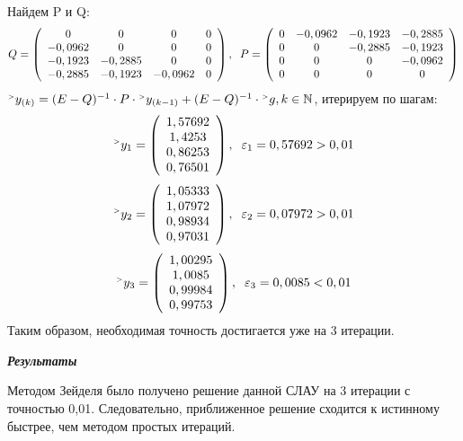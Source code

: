 \documentclass[12pt]{article}
\begin{document}
Найдем P и Q:
\begin{equation*}
	Q = \left(
	\begin{array}{cccc}
		0 & 0 & 0 & 0 \\
		-0,0962 & 0 & 0 & 0 \\
		-0,1923 & -0,2885 & 0 & 0 \\
		-0,2885 & -0,1923 & -0,0962 & 0 \\
	\end{array}
	\right), \hspace{0.2cm}
	P = \left(
	\begin{array}{cccc}
		0 & -0,0962 & -0,1923 & -0,2885 \\
		0 & 0 & -0,2885 & -0,1923 \\
		0 & 0 & 0 & -0,0962 \\
		0 & 0 & 0 & 0 \\
	\end{array}
	\right)
\end{equation*}
$ {}^{\mathsmaller{>}} y_{(k)} = (E-Q)^{-1} \cdot P\cdot 
{}^{\mathsmaller{>}} y_{(k-1)} + (E-Q)^{-1} \cdot
{}^{\mathsmaller{>}} g, k \in \mathbb{N} $, 
итерируем по шагам:
\begin{equation*}
	{}^{\mathsmaller{>}} y_{1}= 
	\left(
	\begin{array}{c}
		1,57692 \\ 1,4253 \\ 0,86253 \\ 0,76501 \\ 
	\end{array}
	\right), \hspace{0.2cm}
	\varepsilon_1 = 0,57692 > 0,01
\end{equation*}
\begin{equation*}
	{}^{\mathsmaller{>}} y_{2}= 
	\left(
	\begin{array}{c}
		1,05333 \\ 1,07972 \\ 0,98934 \\ 0,97031 \\ 
	\end{array}
	\right), \hspace{0.2cm}
	\varepsilon_2 = 0,07972 > 0,01
\end{equation*}
\begin{equation*}
	{}^{\mathsmaller{>}} y_{3}= 
	\left(
	\begin{array}{c}
		1,00295 \\ 1,0085 \\ 0,99984 \\ 0,99753 \\ 
	\end{array}
	\right), \hspace{0.2cm}
	\varepsilon_3 = 0,0085 < 0,01
\end{equation*}
Таким образом, необходимая точность достигается уже на 3 итерации.
\begin{center}
	\textbf{\textit{Результаты}}
\end{center}
Методом Зейделя было получено решение данной СЛАУ на 3 итерации с точностью 0,01. Следовательно, приближенное решение сходится к истинному быстрее, чем методом простых итераций.
\end{document}
